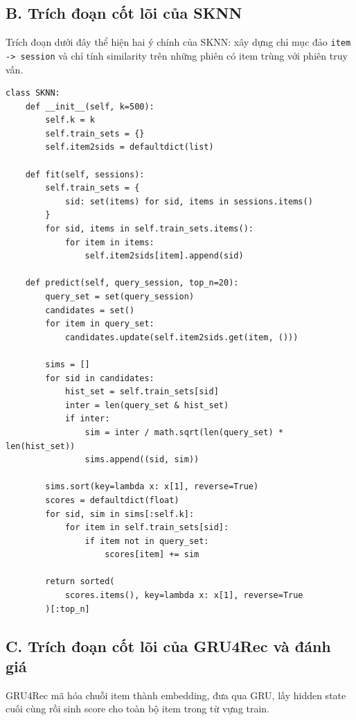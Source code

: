 \documentclass[12pt, a4paper]{article}
\begin{document}
\subsection*{B. Trích đoạn cốt lõi của SKNN}

Trích đoạn dưới đây thể hiện hai ý chính của SKNN: xây dựng chỉ mục đảo \texttt{item -> session} và chỉ tính similarity trên những phiên có item trùng với phiên truy vấn.

\begin{lstlisting}[caption={Trích đoạn SKNN với chỉ mục đảo (src/models/sknn.py)}, label={lst:sknn_core}]
class SKNN:
    def __init__(self, k=500):
        self.k = k
        self.train_sets = {}
        self.item2sids = defaultdict(list)

    def fit(self, sessions):
        self.train_sets = {
            sid: set(items) for sid, items in sessions.items()
        }
        for sid, items in self.train_sets.items():
            for item in items:
                self.item2sids[item].append(sid)

    def predict(self, query_session, top_n=20):
        query_set = set(query_session)
        candidates = set()
        for item in query_set:
            candidates.update(self.item2sids.get(item, ()))

        sims = []
        for sid in candidates:
            hist_set = self.train_sets[sid]
            inter = len(query_set & hist_set)
            if inter:
                sim = inter / math.sqrt(len(query_set) * len(hist_set))
                sims.append((sid, sim))

        sims.sort(key=lambda x: x[1], reverse=True)
        scores = defaultdict(float)
        for sid, sim in sims[:self.k]:
            for item in self.train_sets[sid]:
                if item not in query_set:
                    scores[item] += sim

        return sorted(
            scores.items(), key=lambda x: x[1], reverse=True
        )[:top_n]
\end{lstlisting}

\subsection*{C. Trích đoạn cốt lõi của GRU4Rec và đánh giá}

GRU4Rec mã hóa chuỗi item thành embedding, đưa qua GRU, lấy hidden state cuối cùng rồi sinh score cho toàn bộ item trong từ vựng train.
\end{document}
